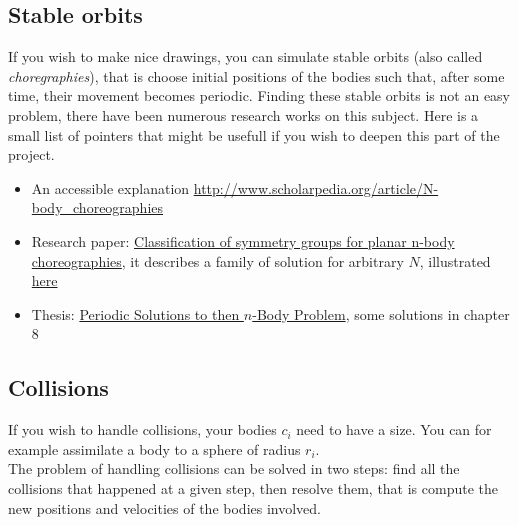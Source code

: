 \documentclass{article}
\begin{document}
\subsection{Stable orbits}
\label{solstables}

If you wish to make nice drawings, you can simulate stable orbits (also called \emph{choregraphies}), that is choose initial positions of the bodies such that, after some time, their movement becomes periodic.
Finding these stable orbits is not an easy problem, there have been numerous research works on this subject. Here is a small list of pointers that might be usefull if you wish to deepen this part of the project.

\begin{itemize}
    \item An accessible explanation \url{http://www.scholarpedia.org/article/N-body_choreographies}
    \item Research paper: \href{http://eprints.maths.manchester.ac.uk/2063/1/choreographies.pdf}{Classification of symmetry groups for planar n-body choreographies}, it describes a family of solution for arbitrary $N$, illustrated \href{http://rectangleworld.com/demos/nBody/}{here}
    \item Thesis: \href{http://www.combinatorialmath.ca/Students/DyckThesis.pdf}{Periodic Solutions to then $n$-Body Problem}, some solutions in chapter 8
\end{itemize}

\subsection{Collisions}
\label{collisions}

If you wish to handle collisions, your bodies $c_i$ need to have a size. You can for example assimilate a body to a sphere of radius $r_i$.\\
The problem of handling collisions can be solved in two steps: find all the collisions that happened at a given step, then resolve them, that is compute the new positions and velocities of the bodies involved.\\
\end{document}
